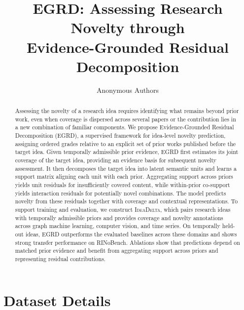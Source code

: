 \documentclass{article} %
\title{EGRD: Assessing Research Novelty through\\
Evidence-Grounded Residual Decomposition}
\author{Anonymous Authors}
\begin{document}
\maketitle

\begin{abstract}
Assessing the novelty of a research idea requires identifying what remains
beyond prior work, even when coverage is dispersed across several papers or
the contribution lies in a new combination of familiar components. We propose
Evidence-Grounded Residual Decomposition (EGRD), a supervised framework for
idea-level novelty prediction, assigning ordered grades relative to an explicit
set of prior works published before the target idea. Given temporally
admissible prior evidence, EGRD first estimates its joint coverage of the
target idea, providing an evidence basis for subsequent novelty assessment.
It then decomposes the target idea into latent semantic units and learns a
support matrix aligning each unit with each prior.
Aggregating support across priors yields unit residuals for insufficiently
covered content, while within-prior co-support yields interaction residuals
for potentially novel combinations. The model predicts novelty from these
residuals together with coverage and contextual representations. To support
training and evaluation, we construct \textsc{IdeaDelta}, which pairs research
ideas with temporally admissible priors and provides coverage
and novelty annotations across graph machine learning, computer vision, and
time series. On temporally held-out ideas, EGRD outperforms the evaluated
baselines across these domains and shows strong transfer performance
on RINoBench. Ablations show that predictions depend on
matched prior evidence and benefit from aggregating support across priors and
representing residual contributions.
\end{abstract}



% 








\appendix



\section{Dataset Details}
\label{app:dataset-details}
\end{document}
